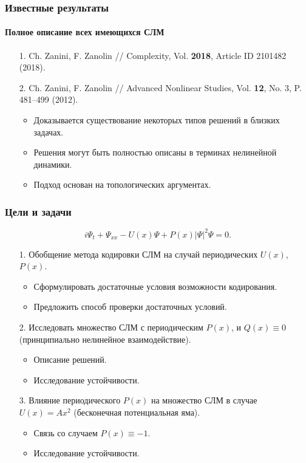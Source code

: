 \documentclass [10pt] {beamer}
\begin{document}
\begin{frame}
	\frametitle{Известные результаты}
	\framesubtitle{Полное описание всех имеющихся СЛМ}
	
	\begin{small}
	\begin{enumerate}
		\setlength\itemsep{5pt}
		\item[1.] Ch. Zanini, F. Zanolin // Complexity, Vol. {\bf 2018}, Article ID 2101482 (2018).
		\item[2.] Ch. Zanini, F. Zanolin // Advanced Nonlinear Studies, Vol. {\bf 12}, No. 3, P. 481--499 (2012).
			\begin{itemize}
				\item Доказывается существование некоторых типов решений в близких задачах.
				\item Решения могут быть полностью описаны в терминах нелинейной динамики.
				\item Подход основан на топологических аргументах.
			\end{itemize}
	\end{enumerate}
	\end{small}
\end{frame}

\begin{frame}
	\frametitle{Цели и задачи}
	
	\begin{equation*}
		i \Psi_t + \Psi_{xx} - U(x) \Psi + P(x) |\Psi|^2 \Psi = 0.
	\end{equation*}
	
	\begin{enumerate}
		\item[1.] Обобщение метода кодировки СЛМ на случай периодических $U(x)$, $P(x)$.
			\begin{itemize}
				\item Сформулировать достаточные условия возможности кодирования.
				\item Предложить способ проверки достаточных условий.
			\end{itemize}
		\item[2.] Исследовать множество СЛМ с периодическим $P(x)$, и $Q(x) \equiv 0$ (принципиально нелинейное взаимодействие).
			\begin{itemize}
				\item Описание решений.
				\item Исследование устойчивости.
			\end{itemize}
		\item[3.] Влияние периодического $P(x)$ на множество СЛМ в случае $U(x) = A x^2$ (бесконечная потенциальная яма).
			\begin{itemize}
				\item Связь со случаем $P(x) \equiv -1$.
				\item Исследование устойчивости.
			\end{itemize}
	\end{enumerate}
\end{frame}
\end{document}
